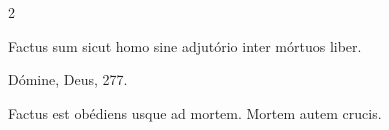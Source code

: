 \documentclass[9pt,twoside]{extarticle}
\begin{document}
\begin{multicols}{2}
\begin{tightlist}{}
\item {} Factus sum sicut homo sine adjutório inter mórtuos liber.
\item {} Dómine, Deus, 277.
\end{tightlist}{}

%
%
%
%
%
%
%
%
%
%
%
%
%
%
%
%
%
%
%
%

\begin{tightlist}{}
\item {} Factus est obédiens usque ad mortem.  Mortem autem crucis.
\end{tightlist}


\end{multicols}
\end{document}

